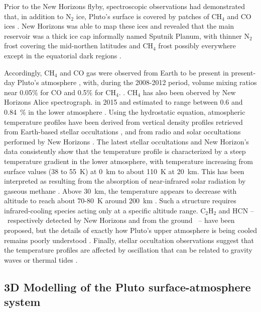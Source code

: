Prior to the New Horizons flyby, spectroscopic observations 
had demonstrated that, in addition to N$_2$ ice, Pluto's surface is covered by patches of
CH$_4$ and CO ices \citep{Owen:93,Dout:99,Grun:13}. 
New Horizons was able to map these ices and revealed that the main reservoir was a
thick ice cap informally named Sputnik Planum, with thinner 
N$_2$ frost covering the
mid-northen latitudes and CH$_4$ frost possibly everywhere except in the equatorial dark regions
\citep{Grun:16}. 

Accordingly, CH$_4$ and CO gas were observed from Earth to be present in present-day 
Pluto's atmosphere 
\citep{Youn:97,Lell:09,Lell:11co,Lell:15,Lell:16},
with, during the 2008-2012 period,
volume mixing ratios near 
0.05\% for CO and 0.5\% for CH$_4$.
\citep{Lell:11co,Lell:15}.
CH$_4$ has also been oberved by New Horizons Alice spectrograph.
in 2015 and estimated to range between 0.6 and 0.84~\% in the lower
atmosphere \citep{Glad:16}.
Using the hydrostatic equation, atmospheric temperature profiles 
have been derived from vertical density profiles 
retrieved from Earth-based stellar occultations
\citep{Elli:89,Sica:03,Elli:07,Pers:08,Youn:08,Dias:15,Sica:16}, and  from 
radio and solar occultations performed by New Horizons \citep{Hins:15dps,Glad:16}.
The latest stellar occultations and New Horizon's data consistently show that 
the temperature profile is characterized by a steep temperature gradient 
in the lower atmosphere, 
with temperature increasing from surface values (38 to 55~K) at 0~km 
to about 110~K at 20~km. 
This has been interpreted as resulting from the absorption of near-infrared solar radiation
by gaseous methane \citep{Yell:89,Stro:96}. 
Above 30~km, the temperature appears to decrease with altitude 
to reach about 70-80~K around 200~km \citep{Dias:15,Gurw:15dps,Glad:16}. 
Such a structure requires
infrared-cooling species acting only at a specific altitude range. 
C$_2$H$_2$ and HCN --~respectively
detected by New Horizons \citep{Glad:16} and from the ground
\citep{Lell:16}~--
have been proposed, but the details of exactly how Pluto’s upper atmosphere is
being cooled remains poorly understood \citep{Glad:16}. 
Finally, stellar occultation observations suggest
that the temperature profiles are affected by oscillation that can be related to gravity waves or
thermal tides \citep{Sica:03,Pers:08,Toig:10}.

\subsection{3D Modelling of the Pluto surface-atmosphere system}

